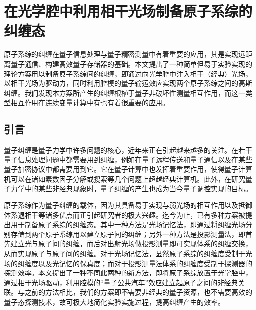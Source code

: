 
\chapter{在光学腔中利用相干光场制备原子系综的纠缠态}\label{chapter4}
\vbox{}\vbox{}
原子系综的纠缠在量子信息处理与量子精密测量中有着重要的应用，其是实现远距离量子通信、构建高效量子存储器的基础。本文提出了一种简单但易于实验实现的理论方案用以制备原子系综间的纠缠，即通过向光学腔中注入相干（经典）光场，以相干光场为驱动力，同时利用腔模的量子输运效应实现两个原子系综之间的高斯纠缠。我们发现本方案所产生的纠缠根植于量子非破坏性测量相互作用，而这一类型相互作用在连续变量计算中有也有着很重要的应用。

\vbox{}
\section{引言}
\vbox{}
量子纠缠是量子力学中许多问题的核心\cite{bouwmeester2000physics,horodecki2009quantum,knill2005quantum}，近年来正在引起越来越多的关注。在若干量子信息\cite{bennett1993teleporting,bennett1992communication,beige2001secure}处理问题中都需要用到纠缠，例如在量子远程传送\cite{pirandola2015advances,herbst2017quantum}和量子通信\cite{gisin2007quantum,ursin2007entanglement}以及在某些量子加密协议中\cite{broadbent2019uncloneable,yang2018mutual}都需要用到它。它在量子计算\cite{maezawa2018toward,grover1996fast}中也发挥着重要作用，使得量子计算机可以在诸如素数因子分解或搜索\cite{nielsen2002quantum,ekert1996quantum,vandersypen2001experimental}等几个问题上超越经典计算机。此外，在研究量子力学中的某些非经典现象时，量子纠缠的产生也成为当今量子调控实现的目标。

原子系综作为量子纠缠的载体，因为其具备易于实现与弱光场的相互作用以及抵御体系退相干等诸多优点而正引起研究者的极大兴趣。迄今为止，已有多种方案被提出用于制备原子系综的纠缠态。其中一种方法是光场记忆法\cite{lukin2000entanglement}，即通过将纠缠光场分别存储到两个原子系综用以建立原子间的纠缠；另外一种方法是投影测量法\cite{duan2000quantum}，即首先建立光与原子间的纠缠，而后对出射光场做投影测量即可实现体系的纠缠交换，从而实现原子与原子间的纠缠。对于光场记忆法，显然原子系综的纠缠度受制于光场的纠缠度以及光记忆的保真度；而对于投影测量法体系的纠缠度受制于探测器的探测效率。本文提出了一种不同此两种的新方法，即将原子系综放置于光学腔中，通过相干光场驱动，利用腔模的“量子公共汽车”效应建立起原子之间的非经典关联。与之前的方法相比，我们的方案即不需要非经典的量子资源，也不需要高效的量子态探测技术，故可极大地简化实验实施过程，提高纠缠产生的效率。

